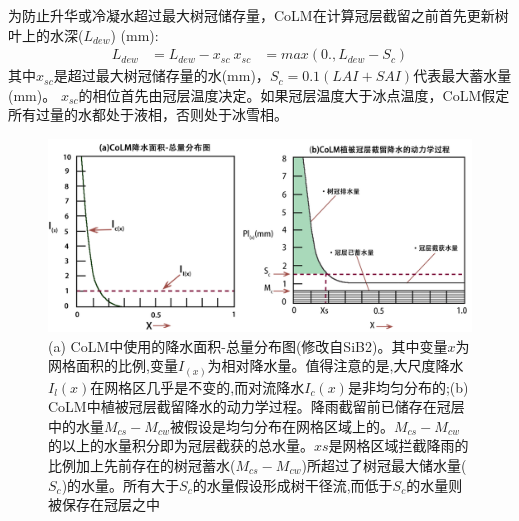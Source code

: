 为防止升华或冷凝水超过最大树冠储存量，CoLM在计算冠层截留之前首先更新树叶上的水深($L_{dew}$) (mm):
\begin{equation}
\begin{aligned}
L_{dew} &= L_{dew}-x_{sc} \
x_{s c} &= max \left(0., L_{dew}-S_{c}\right)
\end{aligned}
\end{equation}
其中$x_{sc}$是超过最大树冠储存量的水(mm)，$S_c=0.1\left(LAI+SAI\right)$代表最大蓄水量(mm)。
$x_{sc}$的相位首先由冠层温度决定。如果冠层温度大于冰点温度，CoLM假定所有过量的水都处于液相，否则处于冰雪相。
{
\begin{figure}[htbp]
\centering
\includegraphics[scale=0.75]{Figures/植被冠层和土壤水分/CoLM冠层截留示意图.png}
\caption[(a) CoLM中使用的降水面积-总量分布图；(b) CoLM中植被冠层截留降水的动力学过程]{(a) CoLM中使用的降水面积-总量分布图(修改自SiB2)。其中变量$x$为网格面积的比例,变量$I_{\left(x\right)}$为相对降水量。值得注意的是,大尺度降水$I_l\left(x\right)$在网格区几乎是不变的,而对流降水$I_c\left(x\right)$是非均匀分布的;(b) CoLM中植被冠层截留降水的动力学过程。降雨截留前已储存在冠层中的水量$M_{cs}-M_{cw}$被假设是均匀分布在网格区域上的。$M_{cs}-M_{cw}$的以上的水量积分即为冠层截获的总水量。$xs$是网格区域拦截降雨的比例加上先前存在的树冠蓄水($M_{cs}-M_{cw}$)所超过了树冠最大储水量($S_c$)的水量。所有大于$S_c$的水量假设形成树干径流,而低于$S_c$的水量则被保存在冠层之中}
\label{fig:CoLM冠层截留示意图}
\end{figure}
}

